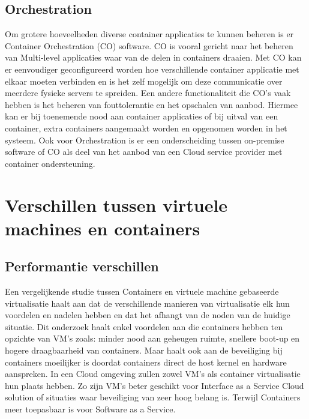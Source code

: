 \subsection{Orchestration}
Om grotere hoeveelheden diverse container applicaties te kunnen beheren is er Container Orchestration (CO) software. CO is vooral gericht naar het beheren van Multi-level applicaties waar van de delen in containers draaien. Met CO kan er eenvoudiger geconfigureerd worden hoe verschillende container applicatie met elkaar moeten verbinden en is het zelf mogelijk om deze communicatie over meerdere fysieke servers te spreiden. Een andere functionaliteit die CO’s vaak hebben is het beheren van fouttolerantie en het opschalen van aanbod. Hiermee kan er bij toenemende nood aan container applicaties of  bij uitval van een container, extra containers aangemaakt worden en opgenomen worden in het systeem. Ook voor Orchestration is er een onderscheiding tussen on-premise software of CO als deel van het aanbod van een Cloud service provider met container ondersteuning\autocite{Casalicchio2020,Truyen2019}.


\section{Verschillen tussen virtuele machines en containers}

\subsection{Performantie verschillen}
Een vergelijkende studie tussen Containers en virtuele machine gebaseerde virtualisatie\autocite{Yadav2018} haalt aan dat de verschillende manieren van virtualisatie elk hun voordelen en nadelen hebben en dat het afhangt van de noden van de huidige situatie. Dit onderzoek haalt enkel voordelen aan die containers hebben ten opzichte van VM’s zoals: minder nood aan geheugen ruimte, snellere boot-up en hogere draagbaarheid van containers. Maar haalt ook aan de beveiliging bij containers moeilijker is doordat containers direct de host kernel en hardware aanspreken. In een Cloud omgeving zullen zowel VM’s als container virtualisatie hun plaats hebben. Zo zijn VM’s beter geschikt voor Interface as a Service Cloud solution of situaties waar beveiliging van zeer hoog belang is. Terwijl Containers meer toepasbaar is voor Software as a Service.

